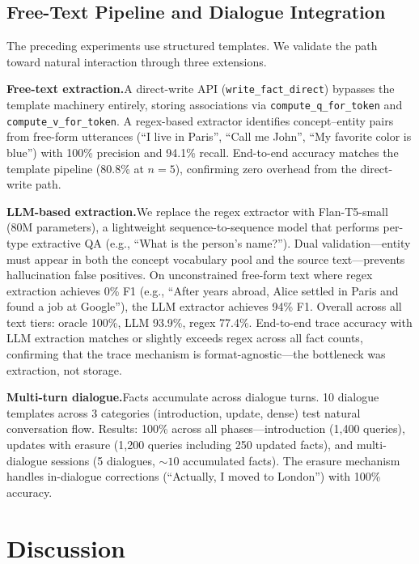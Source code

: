 \documentclass[11pt,a4paper]{article}
\begin{document}
\subsection{Free-Text Pipeline and Dialogue Integration}
\label{sec:freetext}

The preceding experiments use structured templates. We validate the path toward natural interaction through three extensions.

\textbf{Free-text extraction.}\quad A direct-write API (\texttt{write\_fact\_direct}) bypasses the template machinery entirely, storing associations via \texttt{compute\_q\_for\_token} and \texttt{compute\_v\_for\_token}. A regex-based extractor identifies concept--entity pairs from free-form utterances (``I live in Paris'', ``Call me John'', ``My favorite color is blue'') with 100\% precision and 94.1\% recall. End-to-end accuracy matches the template pipeline (80.8\% at $n{=}5$), confirming zero overhead from the direct-write path.

\textbf{LLM-based extraction.}\quad We replace the regex extractor with Flan-T5-small (80M parameters), a lightweight sequence-to-sequence model that performs per-type extractive QA (e.g., ``What is the person's name?''). Dual validation---entity must appear in both the concept vocabulary pool and the source text---prevents hallucination false positives. On unconstrained free-form text where regex extraction achieves 0\% F1 (e.g., ``After years abroad, Alice settled in Paris and found a job at Google''), the LLM extractor achieves 94\% F1. Overall across all text tiers: oracle 100\%, LLM 93.9\%, regex 77.4\%. End-to-end trace accuracy with LLM extraction matches or slightly exceeds regex across all fact counts, confirming that the trace mechanism is format-agnostic---the bottleneck was extraction, not storage.

\textbf{Multi-turn dialogue.}\quad Facts accumulate across dialogue turns. 10 dialogue templates across 3 categories (introduction, update, dense) test natural conversation flow. Results: 100\% across all phases---introduction (1,400 queries), updates with erasure (1,200 queries including 250 updated facts), and multi-dialogue sessions (5 dialogues, ${\sim}10$ accumulated facts). The erasure mechanism handles in-dialogue corrections (``Actually, I moved to London'') with 100\% accuracy.

\section{Discussion}
\end{document}

